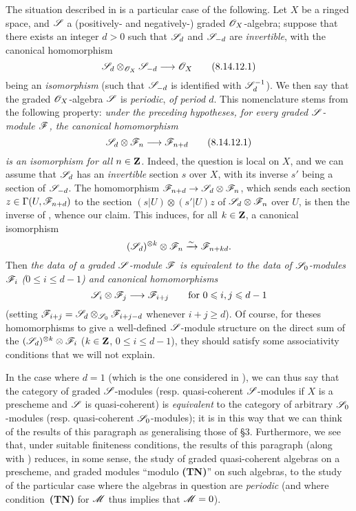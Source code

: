 \begin{remark}[8.14.12]
\label{II.8.14.12}
The situation described in  is a particular case of the following.
Let $X$ be a ringed space, and $\mathscr{S}$ a (positively- and negatively-) graded $\mathscr{O}_X$-algebra;
suppose that there exists an integer $d>0$ such that $\mathscr{S}_d$ and $\mathscr{S}_{-d}$ are \emph{invertible}, with the canonical homomorphism
\[
\label{II.8.14.12.1}
    \sh{S}_d\otimes_{\sh{O}_X}\sh{S}_{-d} \to \sh{O}_X
\tag{8.14.12.1}
\]
being an \emph{isomorphism} (such that $\mathscr{S}_{-d}$ is identified with $\mathscr{S}_d^{-1}$).
We then say that the graded $\mathscr{O}_X$-algebra $\mathscr{S}$ is \emph{periodic}, \emph{of period $d$}.
This nomenclature stems from the following property:
\emph{under the preceding hypotheses, for every graded $\mathscr{S}$-module $\mathscr{F}$, the canonical homomorphism}
\[
\label{II.8.14.12.2}
    \sh{S}_d\otimes\sh{F}_n \to \sh{F}_{n+d}
\tag{8.14.12.1}
\]
\emph{is an isomorphism for all $n\in\mathbf{Z}$.}
Indeed, the question is local on $X$, and we can assume that $\mathscr{S}_d$ has an \emph{invertible} section $s$ over $X$, with its inverse $s'$ being a section of $\mathscr{S}_{-d}$.
The homomorphism $\sh{F}_{n+d}\to\sh{S}_d\otimes\sh{F}_n$, which sends each section $z\in\Gamma(U,\mathscr{F}_{n+d})$ to the section $(s|U)\otimes(s'|U)z$ of $\mathscr{S}_d\otimes\mathscr{F}_n$ over $U$, is then the inverse of , whence our claim.
This induces, for all $k\in\mathbf{Z}$, a canonical isomorphism
\[
    (\mathscr{S}_d)^{\otimes k}\otimes\mathscr{F}_n \xrightarrow{\sim} \mathscr{F}_{n+kd}.
\]
Then \emph{the data of a graded $\mathscr{S}$-module $\mathscr{F}$ is equivalent to the data of $\mathscr{S}_0$-modules $\mathscr{F}_i$ ($0\leq i\leq d-1$) and canonical homomorphisms}
\[
    \sh{S}_i\otimes\sh{F}_j \to \sh{F}_{i+j}
    \qquad
    \mbox{for $0\leq i,j\leq d-1$}
\]
(setting $\mathscr{F}_{i+j}=\mathscr{S}_d\otimes_{\mathscr{S}_0}\mathscr{F}_{i+j-d}$ whenever $i+j\geq d$).
Of course, for theses homomorphisms to give a well-defined $\mathscr{S}$-module structure on the direct sum of the $(\mathscr{S}_d)^{\otimes k}\otimes\mathscr{F}_i$ ($k\in\mathbf{Z}$, $0\leq i\leq d-1$), they should satisfy some associativity conditions that we will not explain.

In the case where $d=1$ (which is the one considered in ), we can thus say that the category of graded $\mathscr{S}$-modules (resp. quasi-coherent $\mathscr{S}$-modules if $X$ is a prescheme and $\mathscr{S}$ is quasi-coherent) is \emph{equivalent} to the category of arbitrary $\mathscr{S}_0$-modules (resp. quasi-coherent $\mathscr{S}_0$-modules);
it is in this way that we can think of the results of this paragraph as generalising those of §3.
Furthermore, we see that, under suitable finiteness conditions, the results of this paragraph (along with ) reduces, in some sense, the study of graded quasi-coherent algebras on a prescheme, and graded modules ``modulo \textbf{(TN)}'' on such algebras, to the study of the particular case where the algebras in question are \emph{periodic} (and where condition~\textbf{(TN)} for $\mathscr{M}$  thus implies that $\mathscr{M}=0$).
\end{remark}

